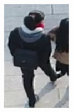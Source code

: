 \begin{figure}[h]
\begin{subfigure}[h]{0.11\textwidth}
        \includegraphics[width=\textwidth]{figures/样本标注示例5.png}
    \end{subfigure}
    ~ %
    \begin{subfigure}[h]{0.11\textwidth}

\end{subfigure}
\end{figure}

